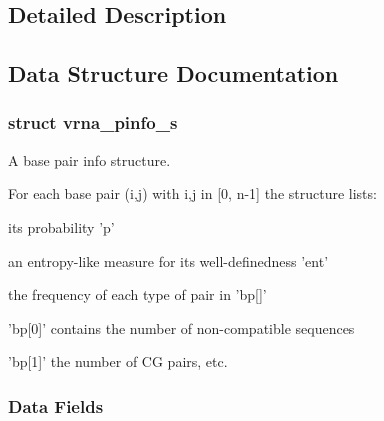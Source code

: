 \subsection{Detailed Description}


\subsection{Data Structure Documentation}
\label{structvrna__pinfo__s}
\hypertarget{group__aln__utils_structvrna__pinfo__s}{}
\subsubsection{struct vrna\+\_\+pinfo\+\_\+s}
A base pair info structure. 

For each base pair (i,j) with i,j in \mbox{[}0, n-\/1\mbox{]} the structure lists\+:
\begin{DoxyItemize}
\item its probability 'p'
\item an entropy-\/like measure for its well-\/definedness 'ent'
\item the frequency of each type of pair in 'bp\mbox{[}\mbox{]}'
\begin{DoxyItemize}
\item 'bp\mbox{[}0\mbox{]}' contains the number of non-\/compatible sequences
\item 'bp\mbox{[}1\mbox{]}' the number of C\+G pairs, etc. 
\end{DoxyItemize}
\end{DoxyItemize}\subsubsection*{Data Fields}
